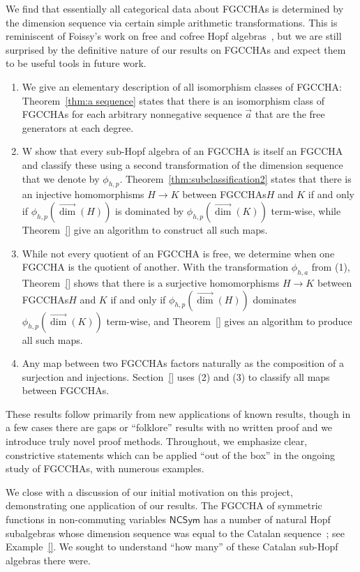 \documentclass[11pt]{amsart}
\theoremstyle{definition}
\numberwithin{equation}{section}
\newcommand{\FGCCHA}{\textsf{FGCCHA}\xspace}
\newcommand{\FGCCHAs}{\textsf{FGCCHA}s\xspace}
\newcommand{\vecdim}{\overrightarrow{\dim}}
\begin{document}
We find that essentially all categorical data about \FGCCHAs is determined by the dimension sequence via certain simple arithmetic transformations.  
This is reminiscent of Foissy's work on free and cofree Hopf algebras~\cite{F12}, but we are still
surprised by the definitive nature of our results on \FGCCHAs and expect them to be useful tools in future work.
\begin{enumerate}[itemsep = 1ex]
\item We give an elementary description of all isomorphism classes of \FGCCHA:
Theorem~\ref{thm:a sequence} states that there is  an isomorphism class of \FGCCHAs
for each arbitrary nonnegative sequence $\vec{a}$
that are the free generators at each degree.

\item W show that every sub-Hopf algebra of an \FGCCHA is itself an \FGCCHA
and classify these using a second transformation of the dimension sequence
that we  denote by $\phi_{h, p}$.  Theorem~\ref{thm:subclassification2} states
that there is an injective homomorphisms $H \to K$ between \FGCCHAs $H$ and $K$
if and only if $\phi_{h, p}(\vecdim(H))$ is dominated by $\phi_{h, p}(\vecdim(K))$
term-wise, while Theorem~\ref{} give an algorithm to construct all such maps.

\item While not every quotient of an \FGCCHA is free, we determine when one \FGCCHA is the quotient of another.  With the transformation $\phi_{h, a}$ from (1), Theorem~\ref{} shows that there is a surjective homomorphisms $H \to K$ between \FGCCHAs $H$ and $K$ if and only if $\phi_{h, p}(\vecdim(H))$ dominates $\phi_{h, p}(\vecdim(K))$ term-wise, and Theorem~\ref{} gives an algorithm to produce all such maps.  

\item Any map between two \FGCCHAs factors naturally as the  composition of a surjection and injections.  Section~\ref{} uses (2) and (3) to classify all maps between \FGCCHAs.

\end{enumerate}
These results follow primarily from new applications of known results, though in a few cases there are gaps or ``folklore'' results with no written proof and we introduce truly novel proof methods.  
Throughout, we emphasize clear, constrictive statements which can be applied ``out of the box'' in the ongoing study of \FGCCHAs, with numerous examples.

We close with a discussion of our initial motivation on this project, demonstrating one application of our results.  
The \FGCCHA of symmetric functions in non-commuting variables $\mathsf{NCSym}$ has a number of natural Hopf subalgebras whose dimension sequence was equal to the Catalan sequence~\cite[A000108]{OEIS}; see Example~\ref{}.  
We sought to understand ``how many'' of these Catalan sub-Hopf algebras there were.  
\end{document}
